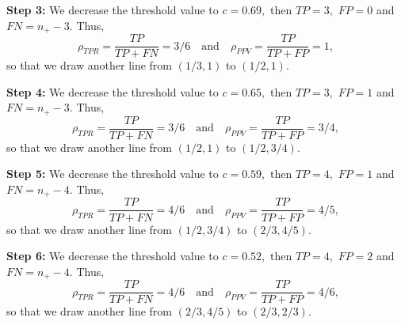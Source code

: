 \documentclass[a4paper]{article}
\begin{document}
{\begin{minipage}{0.5\textwidth}
	\textbf{Step 3:}
We decrease the threshold value to $c=0.69,$ then $TP=3,$ $FP=0$ and $FN= n_+ - 3.$
%
Thus, 
%
%
$$  \rho_{TPR} = \frac{TP}{TP+FN} = 3/6 \quad \mbox{and} \quad \rho_{PPV} = \frac{TP}{TP + FP} =  1, $$
%
so that we draw another line from $(1/3,1)$ to $(1/2,1).$
%
\end{minipage}
\begin{minipage}{0.45\textwidth}
\centering
{}
\end{minipage}

\begin{minipage}{0.5\textwidth}
	\textbf{Step 4:}
We decrease the threshold value to $c=0.65,$ then $TP=3,$ $FP=1$ and $FN= n_+ - 3.$
%
Thus, 
%
%
$$  \rho_{TPR} = \frac{TP}{TP+FN} = 3/6 \quad \mbox{and} \quad \rho_{PPV} = \frac{TP}{TP + FP} =  3/4, $$
%
so that we draw another line from $(1/2,1)$ to $(1/2,3/4).$
%
\end{minipage}
\begin{minipage}{0.45\textwidth}
\centering
{}
\end{minipage}


\begin{minipage}{0.5\textwidth}
	\textbf{Step 5:}
We decrease the threshold value to $c=0.59,$ then $TP=4,$ $FP=1$ and $FN= n_+ - 4.$
%
Thus, 
%
%
$$  \rho_{TPR} = \frac{TP}{TP+FN} = 4/6 \quad \mbox{and} \quad \rho_{PPV} = \frac{TP}{TP + FP} =  4/5, $$
%
so that we draw another line from $(1/2,3/4)$ to $(2/3,4/5).$
%
\end{minipage}
\begin{minipage}{0.45\textwidth}
\centering
{}
\end{minipage}

\begin{minipage}{0.5\textwidth}
	\textbf{Step 6:}
We decrease the threshold value to $c=0.52,$ then $TP=4,$ $FP=2$ and $FN= n_+ - 4.$
%
Thus, 
%
%
$$  \rho_{TPR} = \frac{TP}{TP+FN} = 4/6 \quad \mbox{and} \quad \rho_{PPV} = \frac{TP}{TP + FP} =  4/6, $$
%
so that we draw another line from $(2/3,4/5)$ to $(2/3,2/3).$
%
\end{minipage}
\begin{minipage}{0.45\textwidth}
\centering
{}
\end{minipage}

}
\end{document}
